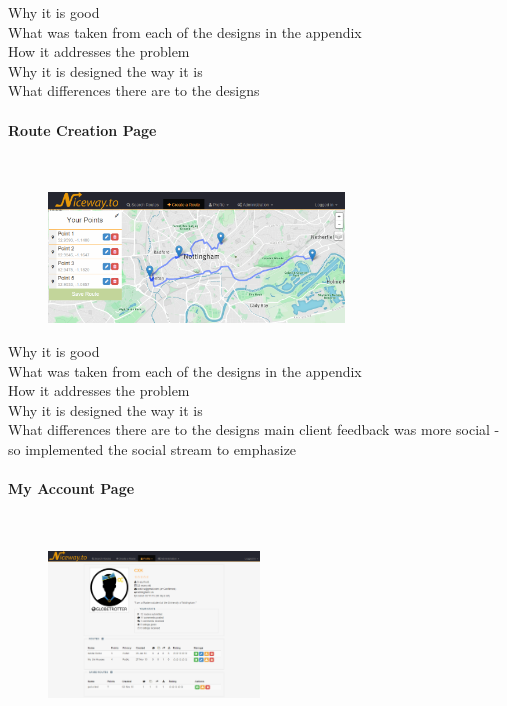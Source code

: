 {\color{red}
\noindent 
Why it is good\ \\
What was taken from each of the designs in the appendix\ \\
How it addresses the problem \ \\
Why it is designed the way it is\ \\
What differences there are to the designs
}

\paragraph{Route Creation Page}\ \\
\begin{figure}[!ht]
	\vspace{-5mm}
	\begin{center}
		\includegraphics[width=0.7\textwidth]{images/design/create.png}
	\end{center}
	\vspace{-5mm}
\end{figure}

{\color{red}
\noindent 
Why it is good\ \\
What was taken from each of the designs in the appendix\ \\
How it addresses the problem \ \\
Why it is designed the way it is\ \\
What differences there are to the designs
}
{\color{blue} main client feedback was more social - so implemented the social stream to emphasize}

\paragraph{My Account Page}\ \\
\begin{figure}[!ht]
	\vspace{-5mm}
	\begin{center}
		\includegraphics[width=0.5\textwidth]{images/design/profile.png}
	\end{center}
	\vspace{-5mm}
\end{figure}

